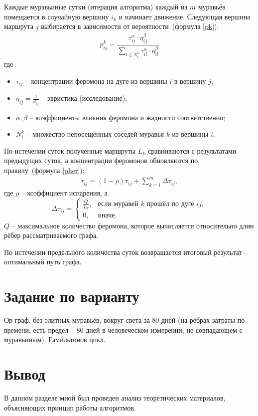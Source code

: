 Каждые муравьиные сутки (итерация алгоритма) каждый из $m$ муравьёв помещается в случайную вершину $i_{k}$ и начинает движение. Следующая вершина маршрута $j$ выбирается в зависимости от вероятности~(формула \ref{pk}):
\begin{align}
	p_{ij}^{k} = \dfrac{\tau_{ij}^{\alpha} \cdot \eta_{ij}^{\beta}}{\sum_{l \in N_{i}^{k}}{\tau_{il}^{\alpha} \cdot \eta_{il}^{\beta}}}
	\label{pk}
\end{align}
где 
\begin{itemize}
	\item $\tau_{ij}$ -- концентрации феромона на дуге из вершины $i$ в  вершину $j$;
	\item $\eta_{ij} = \frac{1}{d_{ij}}$ -- эвристика (исследование);
	\item $\alpha, \beta$ -- коэффициенты влияния феромона и жадности соответственно;
	\item $N_{i}^{k}$ -- множество непосещённых соседей муравья $k$ из вершины $i$.
\end{itemize}
По истечении суток полученные маршруты $L_{k}$ сравниваются с результатами предыдущих суток, а концентрации феромонов обновляются по правилу~(формула \ref{pher}):
\begin{align}
	\tau_{ij} = (1 - \rho)\tau_{ij} + \sum_{k=1}^{m}{\Delta\tau_{ij}},
	\label{pher}
\end{align}
где $\rho$ -- коэффициент испарения, а 
\begin{equation}
	\Delta\tau_{ij} = 
		\begin{cases}
			\frac{Q}{L_{k}}, & \text{если муравей $k$ прошёл по дуге $ij$},\\
			0, & \text{иначе}.
		\end{cases}
\end{equation}
$Q$ -- максимальное количество феромона, которое вычисляется относительно длин рёбер рассматриваемого графа.

По истечении предельного количества суток возвращается итоговый результат -- оптимальный путь графа.

\section{Задание по варианту}

Ор-граф, без элитных муравьёв, вокруг света за 80 дней (на рёбрах затраты по времени; есть предел -- 80 дней в человеческом измерении, не совпадающем с муравьиным). Гамильтонов цикл.


\section*{Вывод}

В данном разделе мной был проведен анализ теоретических материалов, объясняющих принцип работы алгоритмов.

\clearpage
